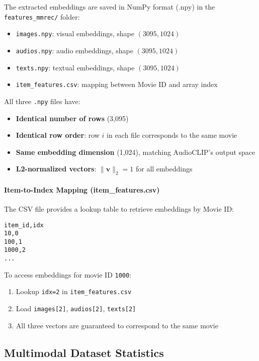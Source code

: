 The extracted embeddings are saved in NumPy format (.npy) in the \texttt{features\_mmrec/} folder:

\begin{itemize}
    \item \texttt{images.npy}: visual embeddings, shape $(3095, 1024)$
    \item \texttt{audios.npy}: audio embeddings, shape $(3095, 1024)$
    \item \texttt{texts.npy}: textual embeddings, shape $(3095, 1024)$
    \item \texttt{item\_features.csv}: mapping between Movie ID and array index
\end{itemize}

All three \texttt{.npy} files have:
\begin{itemize}
    \item \textbf{Identical number of rows} (3,095)
    \item \textbf{Identical row order}: row $i$ in each file corresponds to the same movie
    \item \textbf{Same embedding dimension} (1,024), matching AudioCLIP's output space
    \item \textbf{L2-normalized vectors}: $\|\mathbf{v}\|_2 = 1$ for all embeddings
\end{itemize}

\paragraph{Item-to-Index Mapping (item\_features.csv)}
The CSV file provides a lookup table to retrieve embeddings by Movie ID:

\begin{verbatim}
item_id,idx
10,0
100,1
1000,2
...
\end{verbatim}

To access embeddings for movie ID \texttt{1000}:
\begin{enumerate}
    \item Lookup \texttt{idx=2} in \texttt{item\_features.csv}
    \item Load \texttt{images[2]}, \texttt{audios[2]}, \texttt{texts[2]}
    \item All three vectors are guaranteed to correspond to the same movie
\end{enumerate}

\subsection{Multimodal Dataset Statistics}

